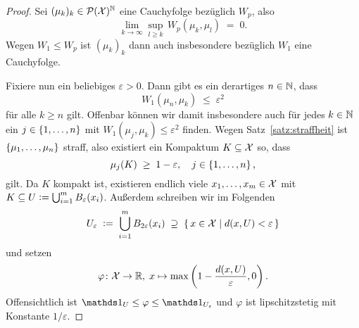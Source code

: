 \documentclass[../thesis/thesis.tex]{subfiles}
\begin{document}
	\begin{proof}
		Sei $(\mu_k)_k \in \mathcal{P}(\mathcal{X})^{\mathbb{N}}$ eine Cauchyfolge bezüglich $W_p$, also
		\[ \lim_{k \to \infty} \sup_{l \geq k} \, W_p(\mu_k, \mu_l) \; = \; 0 \text{.} \]
		Wegen $W_1 \leq W_p$ ist $(\mu_k)_k$ dann auch insbesondere bezüglich $W_1$ eine Cauchyfolge. 
		
		Fixiere nun ein beliebiges $\varepsilon > 0$. Dann gibt es ein derartiges $n \in \mathbb{N}$, dass 
		\[ W_1(\mu_n, \mu_k) \; \leq \; \varepsilon^2 \]
		für alle $k \geq n$ gilt. Offenbar können wir damit insbesondere auch für jedes $k \in \mathbb{N}$ ein $j \in \left\{1, \dots, n\right\}$ mit
		$W_1(\mu_j, \mu_k) \leq \varepsilon^2$ finden. Wegen Satz~\ref{satz:straffheit} ist $\left\{\mu_1, \dots, \mu_n\right\}$ straff, also existiert ein Kompaktum
		$K \subseteq \mathcal{X}$ so, dass
		\[ \mu_j(K) \; \geq \; 1 - \varepsilon, \quad j \in \left\{1, \dots, n\right\} \text{,} \]
		gilt. Da $K$ kompakt ist, existieren endlich viele $x_1, \dots, x_m \in \mathcal{X}$ mit 
		$K \subseteq U \vcentcolon = \bigcup_{i=1}^{m} B_{\varepsilon}(x_i)$.
		Außerdem schreiben wir im Folgenden 
		\[ U_{\varepsilon} \; \vcentcolon = \; \bigcup_{i=1}^{m} B_{2\varepsilon}(x_i) \; \supseteq \; \left\{\, x \in \mathcal{X} \; \middle| \; d(x, U) < \varepsilon \,\right\} \] 
		und setzen 
		\[ \varphi \colon \mathcal{X} \to \mathbb{R}, \; x \mapsto \max \left( 1-\frac{d(x, U)}{\varepsilon}, 0 \right)  \text{.} \]
		Offensichtlich ist $\indfct_U \leq \varphi \leq \indfct_{U_\varepsilon}$ und $\varphi$ ist lipschitzstetig mit Konstante $1/\varepsilon$.
		

\end{proof}
\end{document}
